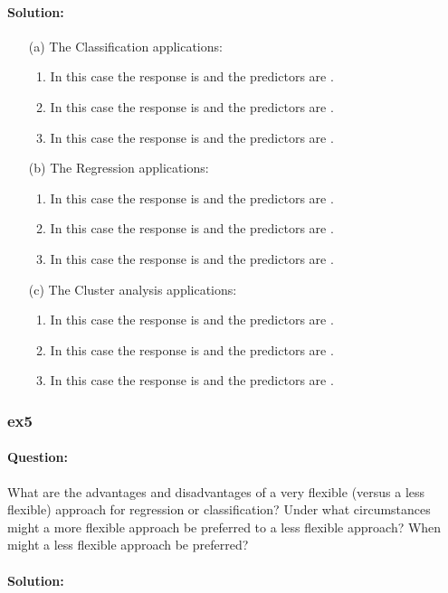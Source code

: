 \documentclass[a4paper,12pt,titlepage]{article} %
\begin{document}
\paragraph{Solution:}
\begin{itemize}
	\item[(a)] The Classification applications: 
	\begin{enumerate}
		\item In this case the response is and the predictors are .
		\item In this case the response is and the predictors are .
		\item In this case the response is and the predictors are .
	\end{enumerate}
	\item[(b)] The Regression applications: 
	\begin{enumerate}
		\item In this case the response is and the predictors are .
		\item In this case the response is and the predictors are .
		\item In this case the response is and the predictors are .
	\end{enumerate}
	\item[(c)] The Cluster analysis applications: 
	\begin{enumerate}
		\item In this case the response is and the predictors are .
		\item In this case the response is and the predictors are .
		\item In this case the response is and the predictors are .
	\end{enumerate}
\end{itemize}


\subsubsection{ex5}
\paragraph{Question:} What are the advantages and disadvantages of a very flexible (versus a less flexible) approach for regression or classification? Under what circumstances might a more flexible approach be preferred to a less flexible approach? When might a less flexible approach be preferred?

\paragraph{Solution:}
\end{document}
